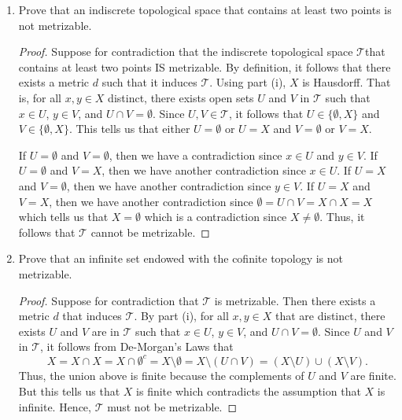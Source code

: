 \documentclass[a4paper]{article}
\begin{document}
\begin{enumerate}
    \item[(ii)] Prove that an indiscrete topological space that contains at least two points is not metrizable.
        \begin{proof}
        Suppose for contradiction that the indiscrete topological space \( \mathcal{T} \)that contains at least two points IS metrizable. By definition, it follows that there exists a metric \( d  \) such that it induces \( \mathcal{T} \). Using part (i), \( X  \) is Hausdorff. That is, for all \( x,y \in X  \) distinct, there exists open sets \( U \) and \( V  \) in \( \mathcal{T} \) such that \( x \in U  \), \( y \in V  \), and \( U \cap V = \emptyset \). Since \( U,V \in \mathcal{T} \), it follows that \( U \in \{ \emptyset, X  \}  \) and \( V \in \{ \emptyset, X  \}  \). This tells us that either \( U = \emptyset  \) or \( U = X  \) and \( V = \emptyset  \) or \( V = X  \).

        If \( U = \emptyset  \) and \( V = \emptyset  \), then we have a contradiction since \( x \in U   \) and \( y \in V  \). 
        If \( U = \emptyset  \) and \( V = X  \), then we have another contradiction since \( x \in U  \). 
        If \( U = X   \) and \( V = \emptyset  \), then we have another contradiction since \( y \in V  \). 
        If \( U = X  \) and \( V = X  \), then we have another contradiction since \( \emptyset =  U \cap V = X \cap X = X   \) which tells us that \( X = \emptyset \) which is a contradiction since \(X \neq \emptyset \).
        Thus, it follows that \( \mathcal{T} \) cannot be metrizable.
        \end{proof}
    \item[(iii)] Prove that an infinite set endowed with the cofinite topology is not metrizable.
        \begin{proof}
         Suppose for contradiction that \( \mathcal{T} \) is metrizable. Then there exists a metric \( d  \) that induces \( \mathcal{T} \). By part (i), for all \( x,y \in X  \) that are distinct, there exists \( U  \) and \( V  \) are in \( \mathcal{T} \) such that \( x \in U  \), \( y \in V  \), and \( U \cap V = \emptyset \).
         Since \( U \) and \( V  \) in \( \mathcal{T} \), it follows from De-Morgan's Laws that 
         \[  X = X \cap X = X \cap \emptyset^{c} =  X \setminus  \emptyset = X \setminus  (U \cap V) = (X \setminus U) \cup (X \setminus  V ).  \]
         Thus, the union above is finite because the complements of \( U  \) and \( V \) are finite. But this tells us that \( X  \) is finite which contradicts the assumption that \( X  \) is infinite. Hence, \( \mathcal{T} \) must not be metrizable.
        \end{proof}
\end{enumerate}
\end{document}
